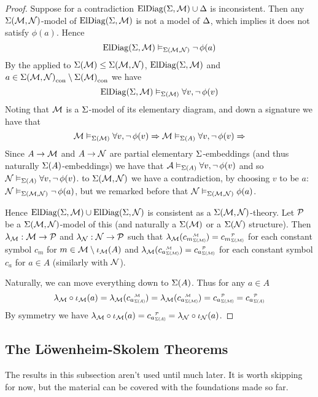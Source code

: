 \begin{proof}
    Suppose for a contradiction $\mathrm{ElDiag}(\Sigma,\mathcal{M}) \cup \Delta$ is inconsistent.
    Then any $\Sigma(\mathcal{M},\mathcal{N})$-model of 
    $\mathrm{ElDiag}(\Sigma,\mathcal{M})$ is not a model of $\Delta$,
    which implies it does not satisfy $\phi(a)$.
    Hence
    \[\mathrm{ElDiag}(\Sigma,\mathcal{M}) \vDash_{\Sigma(\mathcal{M},\mathcal{N})} \neg\, \phi(a)\]
    By the  applied to 
    $\Sigma(\mathcal{M}) \leq \Sigma(\mathcal{M},\mathcal{N})$, $\mathrm{ElDiag}(\Sigma,\mathcal{M})$ and 
    $a \in {\Sigma(\mathcal{M},\mathcal{N})}_\mathrm{con} \setminus {\Sigma(\mathcal{M})}_\mathrm{con}$ we have
    \[\mathrm{ElDiag}(\Sigma,\mathcal{M}) \vDash_{\Sigma(\mathcal{M})} \forall v, \neg\, \phi(v)\]
    Noting that $\mathcal{M}$ is a $\Sigma$-model of its elementary diagram, 
    and  down a signature we have that 
    \[
        \mathcal{M} \vDash_{\Sigma(\mathcal{M})} \forall v, \neg\, \phi(v) \Rightarrow 
        \mathcal{M} \vDash_{\Sigma(A)} \forall v, \neg\, \phi(v) \Rightarrow 
    \]
    Since $A \to \mathcal{M}$ and $A \to \mathcal{N}$ are partial elementary $\Sigma$-embeddings
    (and thus naturally $\Sigma(A)$-embeddings) 
    we have that 
    $\mathcal{A} \vDash_{\Sigma(A)} \forall v, \neg\, \phi(v)$ and so 
    $\mathcal{N} \vDash_{\Sigma(A)} \forall v, \neg\, \phi(v)$.
    to $\Sigma(\mathcal{M},\mathcal{N})$ we have a contradiction, by choosing 
    $v$ to be $a$:
    $\mathcal{N} \vDash_{\Sigma(\mathcal{M},\mathcal{N})} \neg\, \phi(a)$, 
    but we remarked before that $\mathcal{N} \vDash_{\Sigma(\mathcal{M},\mathcal{N})} \phi(a)$.

    Hence $\mathrm{ElDiag}(\Sigma,\mathcal{M}) \cup \mathrm{ElDiag}(\Sigma,\mathcal{N})$
    is consistent as a $\Sigma(\mathcal{M},\mathcal{N})$-theory. 
    Let $\mathcal{P}$ be a $\Sigma(\mathcal{M},\mathcal{N})$-model of this
    (and naturally a $\Sigma(\mathcal{M})$ or a $\Sigma(\mathcal{N})$ structure).
    Then 
    $\lambda_{\mathcal{M}} : \mathcal{M} \to \mathcal{P}$ and $\lambda_{\mathcal{N}} : \mathcal{N} \to \mathcal{P}$ such that 
    $\la_\MM(\subintp{\Si(\MM)}{\MM}{c_m}) = \subintp{\Si(\MM)}{\PP}{c_m}$ 
    for each constant symbol $c_m$ for $m \in \mathcal{M} \setminus \iota_{\mathcal{M}}(A)$ 
    and 
    $\la_\MM(\subintp{\Si(\MM)}{\MM}{c_a}) = \subintp{\Si(\MM)}{\PP}{c_a}$ 
    for each constant symbol $c_a$ for $a \in A$
    (similarly with $\mathcal{N}$).

    Naturally, we can move everything down to $\Sigma(A)$.
    Thus for any $a \in A$
    \[
        \la_\MM \circ \io_\MM(a) = \la_\MM (\subintp{\Si(A)}{\MM}{c_a})
        = \la_\MM (\subintp{\Si(\MM)}{\MM}{c_a}) = 
        \subintp{\Si(\MM)}{\PP}{c_a} = \subintp{\Si(A)}{\PP}{c_a}
    \]
    By symmetry we have 
    $\la_\MM \circ \io_\MM(a) = \subintp{\Si(A)}{\PP}{c_a} =
    \la_\NN \circ \io_\NN(a)$.
\end{proof}

\subsection{The L\"{o}wenheim-Skolem Theorems}
The results in this subsection aren't used until much later. %
It is worth skipping for now, 
but the material can be covered with the foundations made so far.

